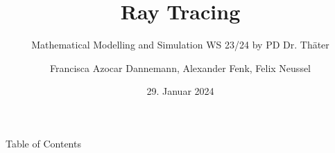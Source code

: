 \documentclass[en, demo]{sdqbeamer}
\title[Ray Tracing]{Ray Tracing}
\subtitle{Mathematical Modelling and Simulation WS 23/24 by PD Dr. Thäter}
\author[Mathematical Modelling and Simulation]{Francisca Azocar Dannemann, Alexander Fenk, Felix Neussel}
\date[29.\,1.\,2024]{29. Januar 2024}
\begin{document}
 
\KITtitleframe

\begin{frame}{Table of Contents}
\tableofcontents
\end{frame}










\begin{frame}

\printbibliography
\end{frame}







\end{document}
